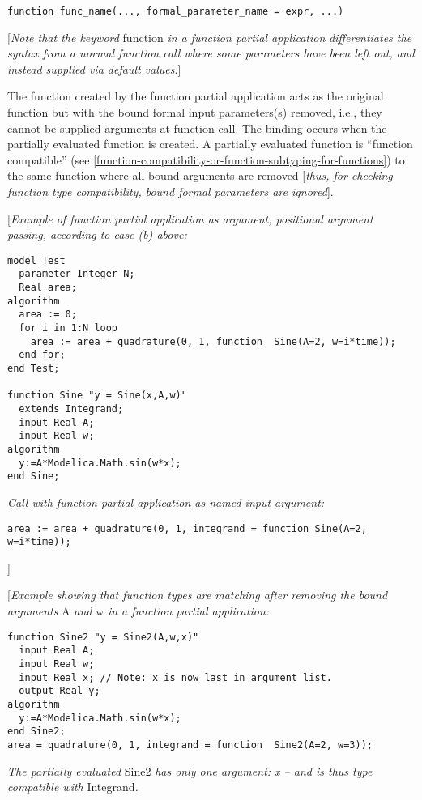 \begin{lstlisting}[language=modelica]
  function func_name(..., formal_parameter_name = expr, ...)
\end{lstlisting}
{[}\emph{Note that the keyword} function \emph{in a function partial
application} \emph{differentiates the syntax from a normal function call
where some parameters have been left out, and instead supplied via
default values}.{]}

The function created by the function partial application acts as the
original function but with the bound formal input parameters(s) removed,
i.e., they cannot be supplied arguments at function call. The binding
occurs when the partially evaluated function is created. A partially
evaluated function is ``function compatible'' (see \autoref{function-compatibility-or-function-subtyping-for-functions}) to the
same function where all bound arguments are removed {[}\emph{thus, for
checking function type compatibility, bound formal parameters are
ignored}{]}.

{[}\emph{Example of function partial application as argument, positional
argument passing, according to case (b) above:}

\begin{lstlisting}[language=modelica]
model Test
  parameter Integer N;
  Real area;
algorithm
  area := 0;
  for i in 1:N loop
    area := area + quadrature(0, 1, function  Sine(A=2, w=i*time));
  end for;
end Test;

function Sine "y = Sine(x,A,w)"
  extends Integrand;
  input Real A;
  input Real w;
algorithm
  y:=A*Modelica.Math.sin(w*x);
end Sine;
\end{lstlisting}
\emph{Call with function partial application as named input argument:}
\begin{lstlisting}[language=modelica]
area := area + quadrature(0, 1, integrand = function Sine(A=2, w=i*time));
\end{lstlisting}
{]}

{[}\emph{Example showing that function types are matching after removing
the bound arguments} A \emph{and} w \emph{in a function partial
application:}

\begin{lstlisting}[language=modelica]
  function Sine2 "y = Sine2(A,w,x)"
  input Real A;
  input Real w;
  input Real x; // Note: x is now last in argument list.
  output Real y;
algorithm
  y:=A*Modelica.Math.sin(w*x);
end Sine2;
area = quadrature(0, 1, integrand = function  Sine2(A=2, w=3));
\end{lstlisting}
\emph{The partially evaluated} Sine2 \emph{has only one argument: x --
and is thus type compatible with} Integrand\emph{.}

